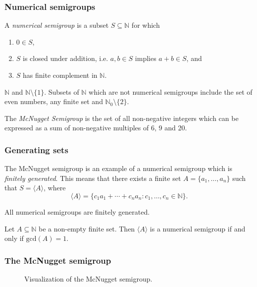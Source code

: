 \documentclass{beamer}
\def\NN{\ensuremath{\mathbb{N}}}
\begin{document}
\begin{frame}
    \frametitle{Numerical semigroups}
    \begin{definition}\label{def:smgps}
        A \textit{numerical semigroup} is a subset $S \subseteq \NN$ for which 
        \begin{enumerate}
            \item $0 \in S$,
            \item $S$ is closed under addition, i.e. $a, b \in S$ implies $a + b \in S$, and
            \item $S$ has finite complement in $\NN$.
        \end{enumerate}
    \end{definition}
    \begin{example}
        $\NN$ and $\NN\setminus \{1\}$. Subsets of $\NN$ which are not numerical semigroups include the set of even numbers, any finite set and $\NN_0 \setminus \{2\}$.
    \end{example}
    
    \begin{example}\label{ex:smgps:mcnugget}
        The \textit{McNugget Semigroup} is the set of all non-negative integers which can be expressed as a sum of non-negative multiples of 6, 9 and 20.
    \end{example}
    
\end{frame}


\begin{frame}
    \frametitle{Generating sets}
    The McNugget semigroup is an example of a numerical semigroup which is \textit{finitely generated}. This means that there exists a finite set $A = \{a_1, \ldots, a_n\}$ such that $S = \langle A \rangle$, where 
    \[\langle A \rangle = \{c_1a_1 + \cdots + c_na_n : c_1, \ldots, c_n \in \NN\}.\]  
    \begin{theorem}\label{thm:smgps:fin_gen}
        All numerical semigroups are finitely generated.
    \end{theorem}
    \begin{theorem}\label{thm:smgps:gcd}
        Let $A \subseteq \NN$ be a non-empty finite set. Then $\langle A \rangle$ is a numerical semigroup if and only if $\mathrm{gcd}(A) = 1$.    
    \end{theorem}
\end{frame}

\begin{frame}
    \frametitle{The McNugget semigroup}
    \begin{figure}
        \centering
        
        \caption{Visualization of the McNugget semigroup.}
    \end{figure}
\end{frame}
\end{document}
